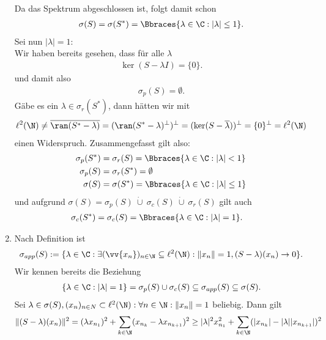 \begin{solution}
\begin{enumerate}[label = (\alph*)]
  Da das Spektrum abgeschlossen ist, folgt damit schon
  \begin{align*}
    \sigma(S) = \sigma(S^*) = \Bbraces{\lambda \in \C: |\lambda| \leq 1}.
  \end{align*}
  Sei nun $|\lambda| = 1$: \\
  Wir haben bereits gesehen, dass für alle $\lambda$
  \begin{align*}
    \ker(S - \lambda I) = \{0\}.
  \end{align*}
  und damit also
  \begin{align*}
    \sigma_p(S) = \emptyset.
  \end{align*}
  Gäbe es ein $\lambda \in \sigma_r(S^*)$, dann hätten wir mit
  \begin{align*}
    \ell^2(\N) \neq \overline{\ran(S^* - \lambda)} = (\ran(S^* - \lambda)^{\bot})^{\bot} =
    (\ker(S - \overline{\lambda}))^{\bot} = \{0\}^{\bot} = \ell^2(\N)
  \end{align*}
  einen Widerspruch. Zusammengefasst gilt also:
  \begin{align*}
    \sigma_p(S^\ast) &= \sigma_r(S) = \Bbraces{\lambda \in \C: |\lambda| < 1} \\
    \sigma_p(S) &= \sigma_r(S^*) = \emptyset \\
    \sigma(S) &= \sigma(S^*) = \Bbraces{\lambda \in \C: |\lambda| \leq 1}
  \end{align*}
  und aufgrund $\sigma(S) = \sigma_p(S) ~\dot \cup~ \sigma_c(S) ~\dot \cup~ \sigma_r(S)$ gilt auch
  \begin{align*}
    \sigma_c(S^\ast) &= \sigma_c(S) = \Bbraces{\lambda \in \C: |\lambda| = 1}.
  \end{align*}
  \item Nach Definition ist
  \begin{align*}
    \sigma_{app}(S) := \{\lambda \in \C: \exists (\vv{x_n})_{n \in \N} \subseteq \ell^2(\N): \|x_n\| = 1, (S - \lambda)(x_n) \to 0\}.
  \end{align*}
  Wir kennen bereits die Beziehung
  \begin{align*}
    \{\lambda \in \C: |\lambda| = 1 \} = \sigma_p(S) \cup \sigma_c(S) \subseteq \sigma_{app}(S) \subseteq \sigma(S).
  \end{align*}
  Sei $\lambda \in \sigma(S), (x_n)_{n \in N} \subset \ell^2(\N): \forall n \in \N: \|x_n\| = 1$ beliebig. Dann gilt
  \begin{align*}
    \|(S - \lambda)(x_n)\|^2 &=  (\lambda x_{n_1})^2 + \sum_{k \in \N}(x_{n_k}- \lambda x_{n_{k+1}})^2
    \geq |\lambda|^2x_{n_1}^2 + \sum_{k \in \N}(|x_{n_k}|- |\lambda| |x_{n_{k+1}}|)^2 \\

\end{align*}
\end{enumerate}
\end{solution}
